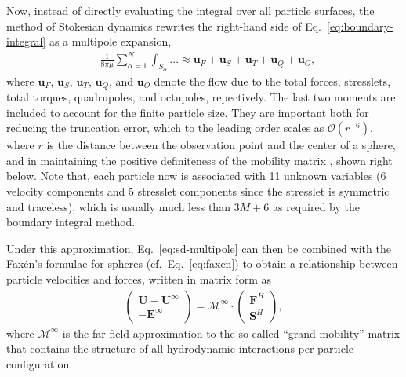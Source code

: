 Now, instead of directly evaluating the integral over all particle surfaces, the method of Stokesian dynamics \citep{durlofsky_brady_bossis_1987} rewrites the right-hand side of Eq.\ \eqref{eq:boundary-integral} as a multipole expansion, \viz
\begin{equation} \label{eq:sd-multipole}
 \begin{aligned}
  - \frac{1}{8\pi \mu} \sum_{\alpha=1}^N  \int_{S_\alpha} ... \approx \bm{u}_F + \bm{u}_S + \bm{u}_T + \bm{u}_Q + \bm{u}_O , 
 \end{aligned}
\end{equation}
where $\bm{u}_F$, $\bm{u}_S$, $\bm{u}_T$, $\bm{u}_Q$, and $\bm{u}_O$ denote the flow due to the total forces, stresslets, total torques, quadrupoles, and octupoles, repectively.
The last two moments are included to account for the finite particle size. They are important both for reducing the truncation error, which to the leading order scales as $\mathcal{O}(r^{-6})$, where $r$ is the distance between the observation point and the center of a sphere, and in maintaining the positive definiteness of the mobility matrix \citep{durlofsky_brady_bossis_1987}, shown right below.
Note that, each particle now is associated with 11 unknown variables (6 velocity components and 5 stresslet components since the stresslet is symmetric and traceless), which is usually much less than $3M+6$ as required by the boundary integral method.

Under this approximation, Eq.\ \eqref{eq:sd-multipole} can then be combined with the Fax\'{e}n's formulae for spheres (cf.\ Eq.\ \ref{eq:faxen}) to obtain a relationship between particle velocities and forces, written in matrix form as
\begin{equation} \label{eq:sd-mob-eq}
 \begin{aligned} 
  \begin{pmatrix}
   {\bm U}-{\bm U}^\infty \\
   -{\bm E}^\infty
  \end{pmatrix}
  = \mathscr{M^\infty} \cdot
  \begin{pmatrix}
   {\bm F}^H \\
   {\bm S}^H
  \end{pmatrix},
 \end{aligned}
\end{equation}
where $\mathscr{M}^\infty$ is the far-field approximation to the so-called ``grand mobility'' matrix that contains the structure of all hydrodynamic interactions per particle configuration.

